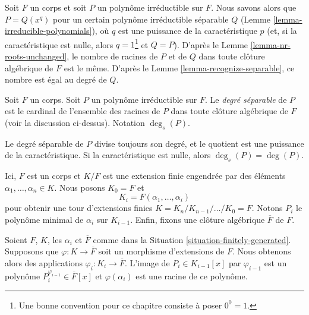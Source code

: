\noindent
Soit $F$ un corps et soit $P$ un polynôme irréductible sur $F$.
Nous savons alors que $P = Q(x^q)$ pour un certain polynôme irréductible séparable $Q$
(Lemme \ref{lemma-irreducible-polynomials}), où $q$ est une puissance de
la caractéristique $p$ (et, si la caractéristique est nulle, alors
$q = 1$\footnote{Une bonne convention pour ce chapitre consiste à poser $0^0 = 1$.}
et $Q = P$). D'après le Lemme \ref{lemma-nr-roots-unchanged}, le nombre de
racines de $P$ et de $Q$ dans toute clôture algébrique de $F$ est le même.
D'après le Lemme \ref{lemma-recognize-separable}, ce nombre est égal au degré
de $Q$.

\begin{definition}
\label{definition-separable-degree}
Soit $F$ un corps. Soit $P$ un polynôme irréductible sur $F$.
Le {\it degré séparable} de $P$ est le cardinal de
l'ensemble des racines de $P$ dans toute clôture algébrique de $F$ (voir la discussion
ci-dessus). Notation $\deg_s(P)$.
\end{definition}

\noindent
Le degré séparable de $P$ divise toujours son degré, et le quotient
est une puissance de la caractéristique. Si la caractéristique est nulle, alors
$\deg_s(P) = \deg(P)$.

\begin{situation}
\label{situation-finitely-generated}
Ici, $F$ est un corps et $K/F$ est une extension finie engendrée par des éléments
$\alpha_1, \ldots, \alpha_n \in K$. Nous posons $K_0 = F$ et
$$
K_i = F(\alpha_1, \ldots, \alpha_i)
$$
pour obtenir une tour d'extensions finies
$K = K_n / K_{n - 1} / \ldots / K_0 = F$.
Notons $P_i$ le polynôme minimal de $\alpha_i$ sur $K_{i - 1}$.
Enfin, fixons une clôture algébrique $\overline{F}$ de $F$.
\end{situation}

\noindent
Soient $F$, $K$, les $\alpha_i$ et $\overline{F}$ comme dans la
Situation \ref{situation-finitely-generated}.
Supposons que $\varphi : K \to \overline{F}$ soit un morphisme d'extensions
de $F$. Nous obtenons alors des applications $\varphi_i : K_i \to \overline{F}$.
L'image de $P_i \in K_{i - 1}[x]$ par $\varphi_{i - 1}$
est un polynôme $P_i^{\varphi_{i - 1}} \in \overline{F}[x]$
et $\varphi(\alpha_i)$ est une racine de ce polynôme.

